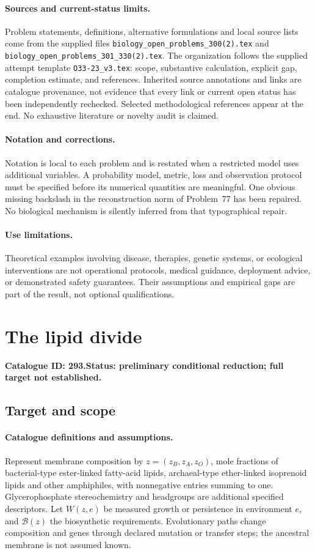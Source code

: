 \documentclass[11pt]{article}
\begin{document}
\paragraph{Sources and current-status limits.}
Problem statements, definitions, alternative formulations and local source lists
come from the supplied files
\texttt{biology\_open\_problems\_300(2).tex} and
\texttt{biology\_open\_problems\_301\_330(2).tex}.
The organization follows the supplied attempt template
\texttt{O33-23\_v3.tex}: scope, substantive calculation, explicit gap,
completion estimate, and references. Inherited source annotations and links are
catalogue provenance, not evidence that every link or current open status has
been independently rechecked. Selected methodological references appear at the
end. No exhaustive literature or novelty audit is claimed.

\paragraph{Notation and corrections.}
Notation is local to each problem and is restated when a restricted model uses
additional variables. A probability model, metric, loss and observation protocol
must be specified before its numerical quantities are meaningful. One obvious
missing backslash in the reconstruction norm of Problem~77 has been repaired.
No biological mechanism is silently inferred from that typographical repair.

\paragraph{Use limitations.}
Theoretical examples involving disease, therapies, genetic systems, or ecological
interventions are not operational protocols, medical guidance, deployment advice,
or demonstrated safety guarantees. Their assumptions and empirical gaps are part
of the result, not optional qualifications.

\setcounter{section}{292}
\section{The lipid divide}
\label{prob:293}
\noindent\textbf{Catalogue ID: 293.}\quad \textbf{Status: preliminary conditional reduction; full target not established.}
\subsection{Target and scope}
\paragraph{Catalogue definitions and assumptions.}
Represent membrane composition by $z=(z_B,z_A,z_O)$, mole fractions of bacterial-type ester-linked fatty-acid lipids, archaeal-type ether-linked isoprenoid lipids and other amphiphiles, with nonnegative entries summing to one. Glycerophosphate stereochemistry and headgroups are additional specified descriptors. Let $W(z,e)$ be measured growth or persistence in environment $e$, and $\mathcal B(z)$ the biosynthetic requirements. Evolutionary paths change composition and genes through declared mutation or transfer steps; the ancestral membrane is not assumed known.
\end{document}
